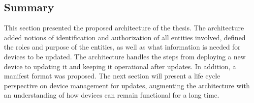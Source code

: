 \documentclass[0-thesis.tex]{subfiles}
\begin{document}
\subsection{Summary}
\label{ssec:architecture-summary}
This section presented the proposed architecture of the thesis. The architecture added
notions of identification and authorization of all entities involved, defined the roles
and purpose of the entities, as well as what information is needed for devices to be
updated. The architecture handles the steps from deploying a new device to updating it and
keeping it operational after updates. In addition, a manifest format was proposed. The next
section will present a life cycle perspective on device management for updates, augmenting
the architecture with an understanding of how devices can remain functional for a long
time.
\end{document}
